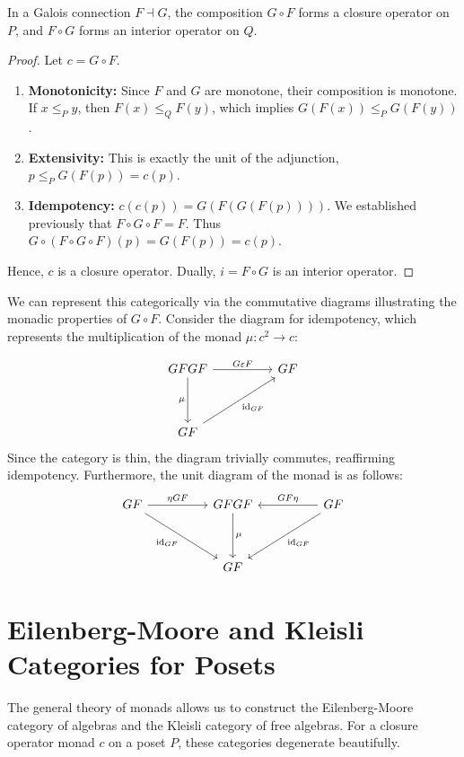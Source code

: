 \begin{theorem}
In a Galois connection $F \dashv G$, the composition $G \circ F$ forms a closure operator on $P$, and $F \circ G$ forms an interior operator on $Q$.
\end{theorem}
\begin{proof}
Let $c = G \circ F$.
\begin{enumerate}
    \item \textbf{Monotonicity:} Since $F$ and $G$ are monotone, their composition is monotone. If $x \leq_P y$, then $F(x) \leq_Q F(y)$, which implies $G(F(x)) \leq_P G(F(y))$.
    \item \textbf{Extensivity:} This is exactly the unit of the adjunction, $p \leq_P G(F(p)) = c(p)$.
    \item \textbf{Idempotency:} $c(c(p)) = G(F(G(F(p))))$. We established previously that $F \circ G \circ F = F$. Thus $G \circ (F \circ G \circ F)(p) = G(F(p)) = c(p)$.
\end{enumerate}
Hence, $c$ is a closure operator. Dually, $i = F \circ G$ is an interior operator.
\end{proof}

We can represent this categorically via the commutative diagrams illustrating the monadic properties of $G \circ F$. Consider the diagram for idempotency, which represents the multiplication of the monad $\mu: c^2 \to c$:

\[\begin{tikzcd}[row sep=huge, column sep=huge]
GFGF \arrow[r, "G \varepsilon F"] \arrow[d, "\mu"'] & GF \\
GF \arrow[ur, "\text{id}_{GF}"'] & 
\end{tikzcd}\]
Since the category is thin, the diagram trivially commutes, reaffirming idempotency. Furthermore, the unit diagram of the monad is as follows:
\[\begin{tikzcd}[row sep=huge, column sep=huge]
GF \arrow[r, "\eta GF"] \arrow[dr, "\text{id}_{GF}"'] & GFGF \arrow[d, "\mu"] & GF \arrow[l, "GF \eta"'] \arrow[dl, "\text{id}_{GF}"] \\
& GF &
\end{tikzcd}\]

\section{Eilenberg-Moore and Kleisli Categories for Posets}
The general theory of monads allows us to construct the Eilenberg-Moore category of algebras and the Kleisli category of free algebras. For a closure operator monad $c$ on a poset $P$, these categories degenerate beautifully.

